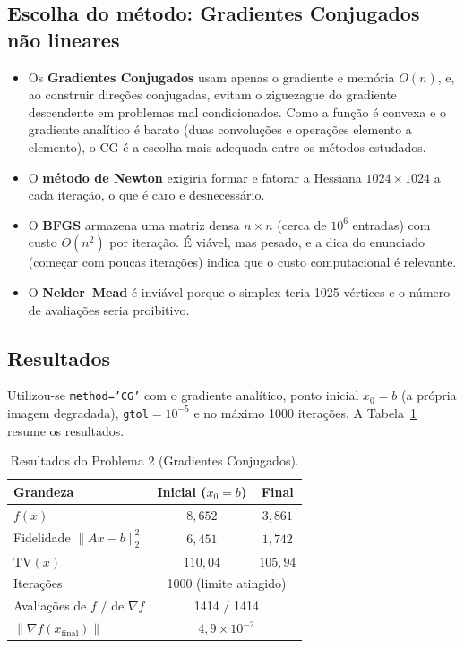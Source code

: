 \documentclass[12pt,a4paper]{article}
\begin{document}
\subsection{Escolha do método: Gradientes Conjugados não lineares}

\begin{itemize}
  \item Os \textbf{Gradientes Conjugados} usam apenas o gradiente e memória $O(n)$, e, ao construir direções conjugadas, evitam o ziguezague do gradiente descendente em problemas mal condicionados. Como a função é convexa e o gradiente analítico é barato (duas convoluções e operações elemento a elemento), o CG é a escolha mais adequada entre os métodos estudados.
  \item O \textbf{método de Newton} exigiria formar e fatorar a Hessiana $1024\times1024$ a cada iteração, o que é caro e desnecessário.
  \item O \textbf{BFGS} armazena uma matriz densa $n\times n$ (cerca de $10^6$ entradas) com custo $O(n^2)$ por iteração. É viável, mas pesado, e a dica do enunciado (começar com poucas iterações) indica que o custo computacional é relevante.
  \item O \textbf{Nelder--Mead} é inviável porque o simplex teria 1025 vértices e o número de avaliações seria proibitivo.
\end{itemize}

\subsection{Resultados}

Utilizou-se \texttt{method='CG'} com o gradiente analítico, ponto inicial $x_0=b$ (a própria imagem degradada), \texttt{gtol}$=10^{-5}$ e no máximo 1000 iterações. A Tabela~\ref{tab:q2} resume os resultados.

\begin{table}[H]
\centering
\caption{Resultados do Problema 2 (Gradientes Conjugados).}
\label{tab:q2}
\begin{tabular}{@{}lcc@{}}
\toprule
Grandeza & Inicial ($x_0=b$) & Final \\
\midrule
$f(x)$ & $8{,}652$ & $3{,}861$ \\
Fidelidade $\|Ax-b\|_2^2$ & $6{,}451$ & $1{,}742$ \\
$\mathrm{TV}(x)$ & $110{,}04$ & $105{,}94$ \\
\midrule
Iterações & \multicolumn{2}{c}{1000 (limite atingido)} \\
Avaliações de $f$ / de $\nabla f$ & \multicolumn{2}{c}{1414 / 1414} \\
$\|\nabla f(x_{\mathrm{final}})\|$ & \multicolumn{2}{c}{$4{,}9\times10^{-2}$} \\
\bottomrule
\end{tabular}
\end{table}
\end{document}
